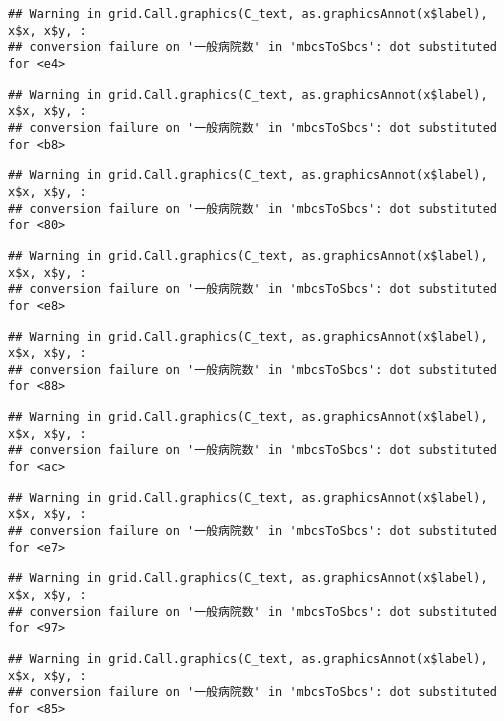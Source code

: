 \documentclass[
]{article}
\begin{document}
\begin{verbatim}
## Warning in grid.Call.graphics(C_text, as.graphicsAnnot(x$label), x$x, x$y, :
## conversion failure on '一般病院数' in 'mbcsToSbcs': dot substituted for <e4>
\end{verbatim}

\begin{verbatim}
## Warning in grid.Call.graphics(C_text, as.graphicsAnnot(x$label), x$x, x$y, :
## conversion failure on '一般病院数' in 'mbcsToSbcs': dot substituted for <b8>
\end{verbatim}

\begin{verbatim}
## Warning in grid.Call.graphics(C_text, as.graphicsAnnot(x$label), x$x, x$y, :
## conversion failure on '一般病院数' in 'mbcsToSbcs': dot substituted for <80>
\end{verbatim}

\begin{verbatim}
## Warning in grid.Call.graphics(C_text, as.graphicsAnnot(x$label), x$x, x$y, :
## conversion failure on '一般病院数' in 'mbcsToSbcs': dot substituted for <e8>
\end{verbatim}

\begin{verbatim}
## Warning in grid.Call.graphics(C_text, as.graphicsAnnot(x$label), x$x, x$y, :
## conversion failure on '一般病院数' in 'mbcsToSbcs': dot substituted for <88>
\end{verbatim}

\begin{verbatim}
## Warning in grid.Call.graphics(C_text, as.graphicsAnnot(x$label), x$x, x$y, :
## conversion failure on '一般病院数' in 'mbcsToSbcs': dot substituted for <ac>
\end{verbatim}

\begin{verbatim}
## Warning in grid.Call.graphics(C_text, as.graphicsAnnot(x$label), x$x, x$y, :
## conversion failure on '一般病院数' in 'mbcsToSbcs': dot substituted for <e7>
\end{verbatim}

\begin{verbatim}
## Warning in grid.Call.graphics(C_text, as.graphicsAnnot(x$label), x$x, x$y, :
## conversion failure on '一般病院数' in 'mbcsToSbcs': dot substituted for <97>
\end{verbatim}

\begin{verbatim}
## Warning in grid.Call.graphics(C_text, as.graphicsAnnot(x$label), x$x, x$y, :
## conversion failure on '一般病院数' in 'mbcsToSbcs': dot substituted for <85>
\end{verbatim}
\end{document}

